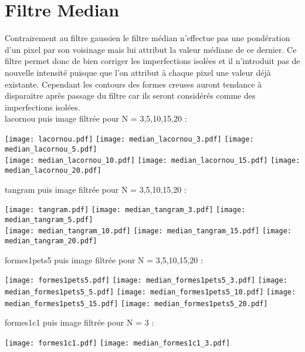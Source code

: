 \documentclass[12pt]{article}
\numberwithin{equation}{section}
\begin{document}
\section{Filtre Median}
Contrairement au filtre gaussien le filtre médian n'effectue pas une pondération d'un pixel par son voisinage mais lui attribut la valeur médiane de ce dernier. Ce filtre permet donc de bien corriger les imperfections isolées et il n'introduit pas de nouvelle intensité puisque que l'on attribut à chaque pixel une valeur déjà existante. Cependant les contours des formes creuses auront tendance à disparaitre après passage du filtre car ils seront considérés comme des imperfections isolées.\\
lacornou puis image filtrée pour N = 3,5,10,15,20 :\\
\begin{center}
\texttt{[image: lacornou.pdf]}
\texttt{[image: median\_lacornou\_3.pdf]}
\texttt{[image: median\_lacornou\_5.pdf]}\\
\texttt{[image: median\_lacornou\_10.pdf]}
\texttt{[image: median\_lacornou\_15.pdf]}
\texttt{[image: median\_lacornou\_20.pdf]}
\end{center}
tangram puis image filtrée pour N = 3,5,10,15,20 :\\
\begin{center}
\texttt{[image: tangram.pdf]}
\texttt{[image: median\_tangram\_3.pdf]}
\texttt{[image: median\_tangram\_5.pdf]}\\
\texttt{[image: median\_tangram\_10.pdf]}
\texttt{[image: median\_tangram\_15.pdf]}
\texttt{[image: median\_tangram\_20.pdf]}
\end{center}
formes1pets5 puis image filtrée pour N = 3,5,10,15,20 :\\
\begin{center}
\texttt{[image: formes1pets5.pdf]}
\texttt{[image: median\_formes1pets5\_3.pdf]}
\texttt{[image: median\_formes1pets5\_5.pdf]}
\texttt{[image: median\_formes1pets5\_10.pdf]}
\texttt{[image: median\_formes1pets5\_15.pdf]}
\texttt{[image: median\_formes1pets5\_20.pdf]}
\end{center}
formes1c1 puis image filtrée pour N = 3 :\\
\begin{center}
\texttt{[image: formes1c1.pdf]}
\texttt{[image: median\_formes1c1\_3.pdf]}
\end{center}
\end{document}
